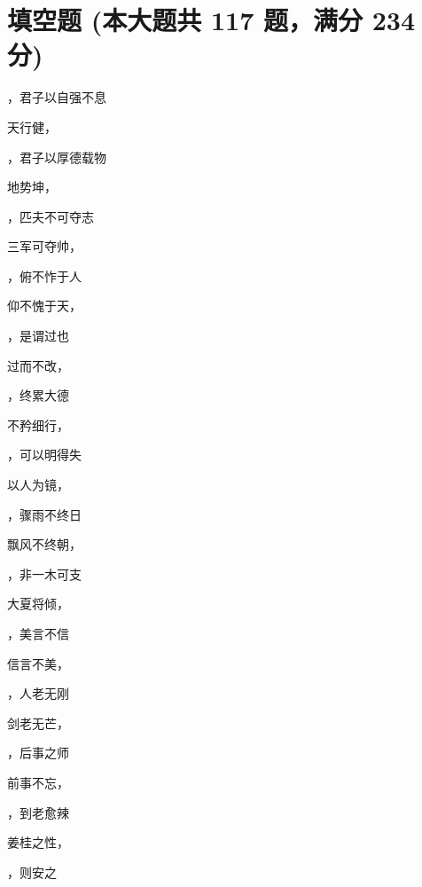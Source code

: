 \documentclass[12pt, a4paper, addpoints, answers]{exam}
\begin{document}
\section{\normalsize{填空题 (本大题共 117 题，满分 234 分)}}
\hspace{1.5cm}
\begin{multicols}{2}
\begin{questions}
\question[2] ，君子以自强不息

\question[2] 天行健，

\question[2] ，君子以厚德载物

\question[2] 地势坤，

\question[2] ，匹夫不可夺志

\question[2] 三军可夺帅，

\question[2] ，俯不怍于人

\question[2] 仰不愧于天，

\question[2] ，是谓过也

\question[2] 过而不改，

\question[2] ，终累大德

\question[2] 不矜细行，

\question[2] ，可以明得失

\question[2] 以人为镜，

\question[2] ，骤雨不终日

\question[2] 飘风不终朝，

\question[2] ，非一木可支

\question[2] 大夏将倾，

\question[2] ，美言不信

\question[2] 信言不美，

\question[2] ，人老无刚

\question[2] 剑老无芒，

\question[2] ，后事之师

\question[2] 前事不忘，

\question[2] ，到老愈辣

\question[2] 姜桂之性，

\question[2] ，则安之


\end{questions}
\end{multicols}
\end{document}
